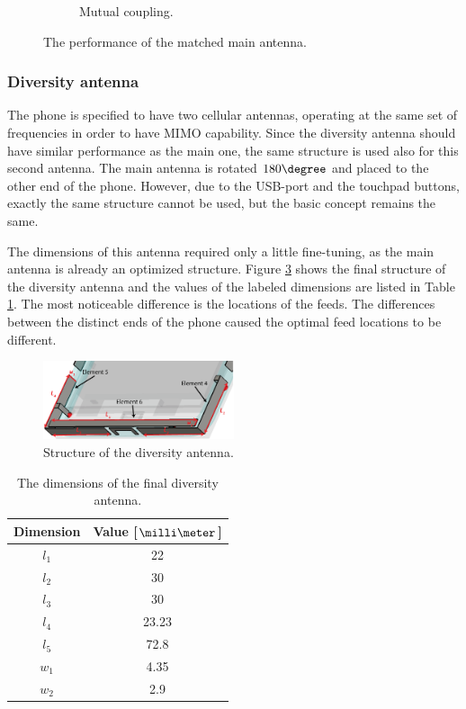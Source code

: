 \begin{figure}[H]
\begin{subfigure}[b]{0.49\textwidth}
        \caption{Mutual coupling.}
        \label{fig:main_final_res_match_coup}
    \end{subfigure}
    \caption{The performance of the matched main antenna.}
\end{figure}


\subsubsection{Diversity antenna}
\label{sec:diversity}
The phone is specified to have two cellular antennas, operating at the same set of frequencies in order to have MIMO capability. Since the diversity antenna should have similar performance as the main one, the same structure is used also for this second antenna. The main antenna is rotated $180\degree$ and placed to the other end of the phone. However, due to the USB-port and the touchpad buttons, exactly the same structure cannot be used, but the basic concept remains the same.

The dimensions of this antenna required only a little fine-tuning, as the main antenna is already an optimized structure. Figure \ref{fig:div_final} shows the final structure of the diversity antenna and the values of the labeled dimensions are listed in Table \ref{tab:div_final}. The most noticeable difference is the locations of the feeds. The differences between the distinct ends of the phone caused the optimal feed locations to be different. 
\begin{figure}[H]
    \centering
    \includegraphics[width=0.5\textwidth]{img/diversity_final.eps}
    \caption{Structure of the diversity antenna.}
    \label{fig:div_final}
\end{figure}
\begin{table}[H]
    \centering
    \caption{The dimensions of the final diversity antenna.}
    \label{tab:div_final}
    \begin{tabular}{|c|c|}
        \hline
        \textbf{Dimension} & \textbf{Value [$\milli\meter$]}\\
        \hline
        $l_1$ & 22 \\
        \hline
        $l_2$ & 30\\
        \hline
        $l_3$ & 30 \\
        \hline
        $l_4$ & 23.23 \\
        \hline
        $l_5$ & 72.8 \\
        \hline
        $w_1$ & 4.35\\
        \hline
        $w_2$ & 2.9\\
        \hline
    \end{tabular}
\end{table}

